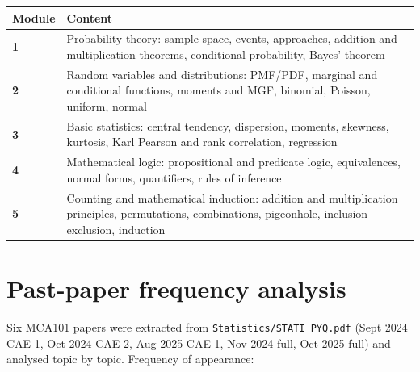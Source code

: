 \documentclass[11pt,a4paper]{article}
\begin{document}
\begin{center}\small
\begin{tabularx}{\textwidth}{>{\bfseries}p{} X}
\toprule Module & Content\\\midrule
1 & Probability theory: sample space, events, approaches, addition and multiplication theorems, conditional probability, Bayes' theorem\\
2 & Random variables and distributions: PMF/PDF, marginal and conditional functions, moments and MGF, binomial, Poisson, uniform, normal\\
3 & Basic statistics: central tendency, dispersion, moments, skewness, kurtosis, Karl Pearson and rank correlation, regression\\
4 & Mathematical logic: propositional and predicate logic, equivalences, normal forms, quantifiers, rules of inference\\
5 & Counting and mathematical induction: addition and multiplication principles, permutations, combinations, pigeonhole, inclusion-exclusion, induction\\\bottomrule
\end{tabularx}
\end{center}

\section{Past-paper frequency analysis}

Six MCA101 papers were extracted from \texttt{Statistics/STATI PYQ.pdf} (Sept 2024 CAE-1, Oct 2024 CAE-2, Aug 2025 CAE-1, Nov 2024 full, Oct 2025 full) and analysed topic by topic. Frequency of appearance:
\end{document}
